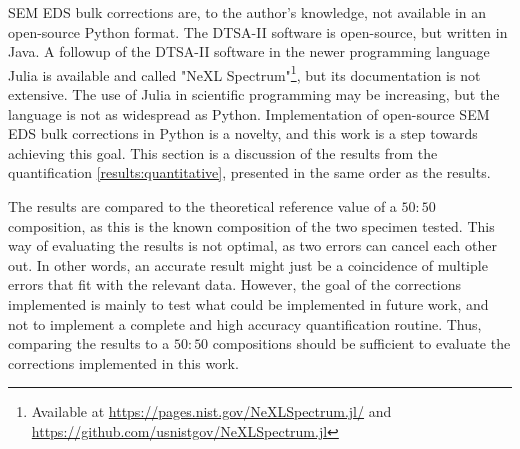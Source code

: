 


SEM EDS bulk corrections are, to the author's knowledge, not available in an open-source Python format.
The DTSA-II software is open-source, but written in Java.
A followup of the DTSA-II software in the newer programming language Julia is available and called "NeXL Spectrum"\footnote{Available at \url{https://pages.nist.gov/NeXLSpectrum.jl/} and \url{https://github.com/usnistgov/NeXLSpectrum.jl}}, but its documentation is not extensive.
The use of Julia in scientific programming may be increasing, but the language is not as widespread as Python.
Implementation of open-source SEM EDS bulk corrections in Python is a novelty, and this work is a step towards achieving this goal.
This section is a discussion of the results from the quantification \cref{results:quantitative}, presented in the same order as the results.



The results are compared to the theoretical reference value of a $50:50$ composition, as this is the known composition of the two specimen tested.
This way of evaluating the results is not optimal, as two errors can cancel each other out.
In other words, an accurate result might just be a coincidence of multiple errors that fit with the relevant data.
However, the goal of the corrections implemented is mainly to test what could be implemented in future work, and not to implement a complete and high accuracy quantification routine.
Thus, comparing the results to a $50:50$ compositions should be sufficient to evaluate the corrections implemented in this work.











